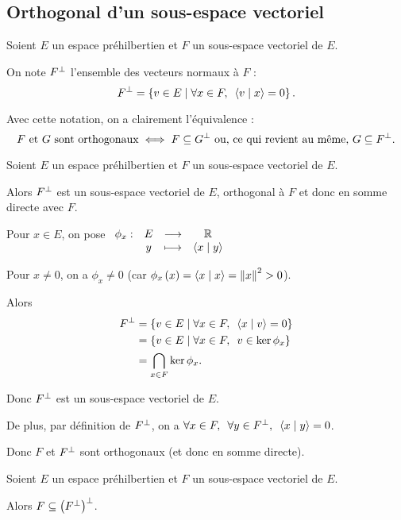 \subsection{Orthogonal d'un sous-espace vectoriel}

\begin{defi}
Soient \(E\) un espace préhilbertien et \(F\) un sous-espace vectoriel de \(E\).

On note \(F^{\perp}\) l'ensemble des vecteurs normaux à \(F\) : \[F\ortho=\accol{v\in E\tq\quantifs{\forall x\in F}\ps{v}{x}=0}.\]
\end{defi}

Avec cette notation, on a clairement l'équivalence : \[F\text{ et }G\text{ sont orthogonaux}\iff F\subseteq G^{\perp}\text{ ou, ce qui revient au même, }G\subseteq F^{\perp}.\]

\begin{theo}
Soient \(E\) un espace préhilbertien et \(F\) un sous-espace vectoriel de \(E\).

Alors \(F^{\perp}\) est un sous-espace vectoriel de \(E\), orthogonal à \(F\) et donc en somme directe avec \(F\).
\end{theo}

\begin{dem}
Pour \(x\in E\), on pose \(\fonction{\phi_x}{E}{\R}{y}{\ps{x}{y}}\)

Pour \(x\not=0\), on a \(\phi_x\not=0\) (car \(\phi_x\paren{x}=\ps{x}{x}=\norme{x}^2>0\)).

Alors \[\begin{aligned}
F\ortho&=\accol{v\in E\tq\quantifs{\forall x\in F}\ps{x}{v}=0} \\
&=\accol{v\in E\tq\quantifs{\forall x\in F}v\in\ker\phi_x} \\
&=\biginter_{x\in F}\ker\phi_x.
\end{aligned}\]

Donc \(F^{\perp}\) est un sous-espace vectoriel de \(E\).

De plus, par définition de \(F^{\perp}\), on a \(\quantifs{\forall x\in F;\forall y\in F\ortho}\ps{x}{y}=0\).

Donc \(F\) et \(F^{\perp}\) sont orthogonaux (et donc en somme directe).
\end{dem}

\begin{prop}
Soient \(E\) un espace préhilbertien et \(F\) un sous-espace vectoriel de \(E\).

Alors \(F\subseteq\left(F^{\perp}\right)^{\perp}\).
\end{prop}


